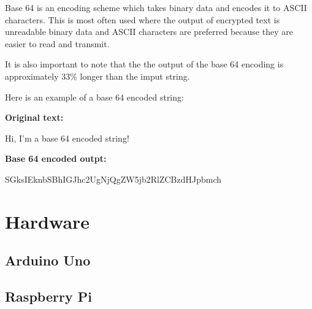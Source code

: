 Base 64 is an encoding scheme which takes binary data and encodes it to ASCII characters. This
is most often used where the output of encrypted text is unreadable binary data and ASCII
characters are preferred because they are easier to read and transmit. 

It is also important to note that the the output of the base 64 encoding is approximately
33\% longer than the imput string.

Here is an example of a base 64 encoded string:

\textbf{Original text:}

Hi, I'm a base 64 encoded string!

\textbf{Base 64 encoded outpt:}

SGksIEknbSBhIGJhc2UgNjQgZW5jb2RlZCBzdHJpbmch

\section{Hardware}

\subsection{Arduino Uno}

\subsection{Raspberry Pi}

